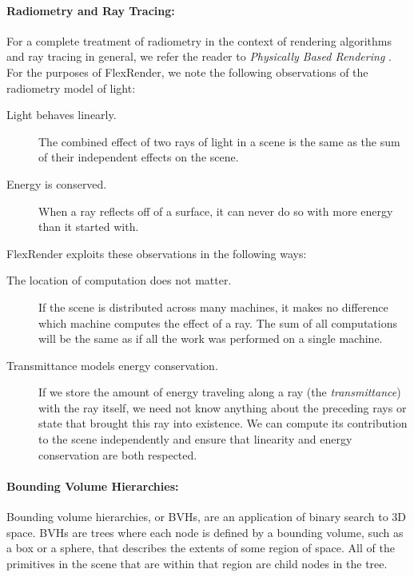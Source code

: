 \documentclass[a4paper,twoside]{article}
\begin{document}
\paragraph{Radiometry and Ray Tracing:}
For a complete treatment of radiometry in the context of rendering algorithms
and ray tracing in general, we refer the reader to
\emph{Physically Based Rendering} \cite{pbrt}. For the purposes of FlexRender,
we note the following observations of the radiometry model of light:

\begin{description}
    \item[Light behaves linearly.] The combined effect of two rays of light
        in a scene is the same as the sum of their independent effects on the
        scene.
    \item[Energy is conserved.] When a ray reflects off of a surface, it can
        never do so with more energy than it started with.
\end{description}

FlexRender exploits these observations in the following ways:

\begin{description}
    \item[The location of computation does not matter.] If the scene is
        distributed across many machines, it makes no difference which machine
        computes the effect of a ray. The sum of all computations will be the
        same as if all the work was performed on a single machine.
    \item[Transmittance models energy conservation.] If we store the amount of
        energy traveling along a ray (the \emph{transmittance}) with the ray
        itself, we need not know anything about the preceding rays or state
        that brought this ray into existence. We can compute its contribution
        to the scene independently and ensure that linearity and energy
        conservation are both respected.
\end{description}

\paragraph{Bounding Volume Hierarchies:}
Bounding volume hierarchies, or BVHs, are an application of binary search to 3D
space. BVHs are trees where each node is defined by a bounding volume, such as
a box or a sphere, that describes the extents of some region of space. All of
the primitives in the scene that are within that region are child nodes in the
tree.
\end{document}
